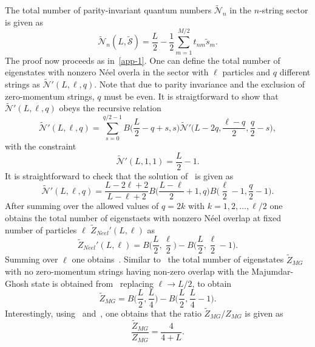 \documentclass[11pt]{iopart}
\begin{document}
The total number of parity-invariant quantum numbers $\widetilde{\mathcal N}_n$ in the 
$n$-string sector is given as  
%
\begin{equation}
\widetilde{\mathcal N}_n(L,\widetilde{\mathcal S})=\frac{L}{2}-\frac{1}{2}
\sum_{m=1}^{M/2}t_{nm}\tilde s_m.
\end{equation}
%
The proof now proceeds as in~\ref{app-1}. One can define the total number of eigenstates 
with nonzero N\'eel overla in the sector with $\ell$ particles and $q$ different strings as 
$\widetilde{\mathcal N}'(L,\ell,q)$. Note that due to parity invariance and the exclusion of 
zero-momentum strings, $q$ must be even. It is straigtforward to show that $\widetilde
{\mathcal N}'(L,\ell,q)$ obeys the recursive relation
%
\begin{equation}
\label{NpLlq-1}
\widetilde{\mathcal N}'(L,\ell,q)=\sum_{s=0}^{q/2-1}B\Big(\frac{L}{2}-q+s,s\Big)\widetilde
{\mathcal N}'\Big(L-2q,\frac{\ell-q}{2},\frac{q}{2}-s\Big),
\end{equation}
% 
with the constraint
%
\begin{equation}
\widetilde{\mathcal N}'(L,1,1)=\frac{L}{2}-1. 
\end{equation}
%
It is straightforward to check that the solution of~ is given as 
%
\begin{equation}
\widetilde{\mathcal N}'(L,\ell,q)=\frac{L-2\ell+2}{L-\ell+2}B\Big(\frac{L-\ell}{2}+1,q\Big)
B\Big(\frac{\ell}{2}-1,\frac{q}{2}-1\Big).
\end{equation}
%
After summing over the allowed values of $q=2k$ with $k=1,2,\dots,\ell/2$ one obtains 
the total number of eigenstaets with nonzero N\'eel overlap at fixed number of 
particles $\ell$ $\widetilde Z_{Neel}'(L,\ell)$ as 
%
\begin{equation}
\label{neel-fi}
\widetilde Z_{Neel}'(L,\ell)=B\Big(\frac{L}{2},\frac{\ell}{2}\Big)-
B\Big(\frac{L}{2},\frac{\ell}{2}-1\Big).
\end{equation}
%
Summing over $\ell$ one obtains~.
Similar to~ the total number of eigenstates $\widetilde Z_{MG}$ 
with no zero-momentum strings having non-zero overlap with the Majumdar-Ghosh 
state is obtained from~ replacing $\ell\to L/2$, to obtain 
%
\begin{equation}
\label{mg-fi}
\widetilde Z_{MG}=B\Big(\frac{L}{2},\frac{L}{4}\Big)-B\Big(\frac{L}{2},\frac{L}{4}-1
\Big). 
\end{equation}
%
Interestingly, using~ and~, one obtains that the ratio 
$\widetilde Z_{MG}/Z_{MG}$ is given as 
%
\begin{equation}
\frac{\widetilde Z_{MG}}{Z_{MG}}=\frac{4}{4+L}. 
\end{equation}
%
\end{document}
